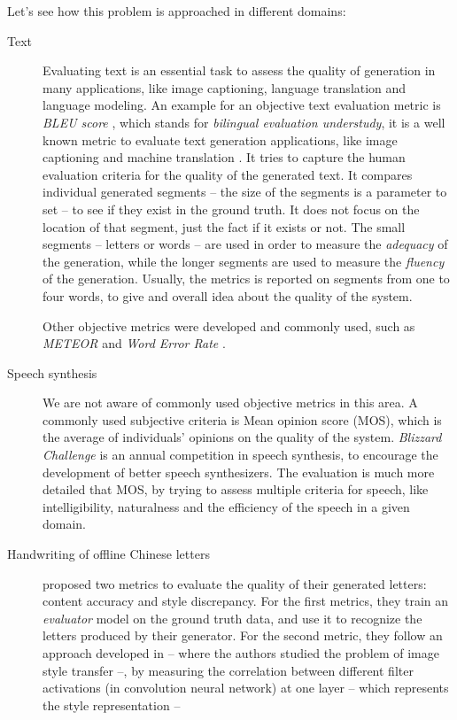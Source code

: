   \par Let's see how this problem is approached in different domains:
  \begin{description}
    \item [Text] Evaluating text is an essential task to assess the quality of generation in many applications, like image captioning, language translation and language modeling. An example for an objective text evaluation metric is \textit{BLEU score} \citep{papineni2002bleu}, which stands for \textit{bilingual evaluation understudy}, it is a well known metric to evaluate text generation applications, like image captioning \citep{karpathy2015deep,vinyals2015show} and machine translation \citep{Sutskever:2014:SSL:2969033.2969173}. It tries to capture the human evaluation criteria for the quality of the generated text. It compares individual generated segments -- the size of the segments is a parameter to set -- to see if they exist in the ground truth. It does not focus on the location of that segment, just the fact if it exists or not. The small segments -- letters or words -- are used in order to measure the \textit{adequacy} of the generation, while the longer segments are used to measure the \textit{fluency} of the generation. Usually, the metrics is reported on segments from one to four words, to give and overall idea about the quality of the system.

    Other objective metrics were developed and commonly used, such as \textit{METEOR} \citep{denkowski:lavie:meteor-wmt:2014} and \textit{Word Error Rate} \citep{klakow2002testing}.

    \item [Speech synthesis] We are not aware of commonly used objective metrics in this area. A commonly used subjective criteria is Mean opinion score (MOS), which is the average of individuals' opinions on the quality of the system. \textit{Blizzard Challenge} \citep{blizzard} is an annual competition in speech synthesis, to encourage the development of better speech synthesizers. The evaluation is much more detailed that MOS, by trying to assess multiple criteria for speech, like intelligibility, naturalness and the efficiency of the speech in a given domain.

    \item [Handwriting of offline Chinese letters] \cite{DBLP:journals/corr/abs-1801-08624} proposed two metrics to evaluate the quality of their generated letters: content accuracy and style discrepancy. For the first metrics, they train an \textit{evaluator} model on the ground truth data, and use it to recognize the letters produced by their generator. For the second metric, they follow an approach developed in \cite{DBLP:journals/corr/GatysEB15a} -- where the authors studied the problem of image style transfer --, by measuring the correlation between different filter activations (in convolution neural network) at one layer -- which represents the style representation --
  \end{description}

